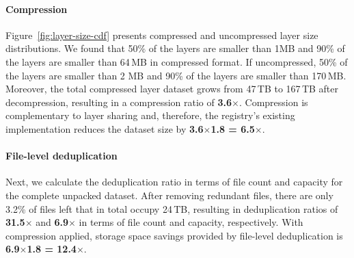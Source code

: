 %
%


%

\paragraph{Compression}
%
Figure~\ref{fig:layer-size-cdf} presents compressed and uncompressed layer size
distributions.
%
We found that 50\% of the layers are smaller than 1MB and 90\% of the layers are
smaller than 64\,MB in compressed format.
%
If uncompressed, 50\% of the layers are smaller than 2 MB and 90\% of the
layers are smaller than 170\,MB.
%
Moreover, the total compressed layer dataset grows from 47\,TB to 167\,TB after
decompression, resulting in a compression ratio of \textbf{3.6$\times$}.
%
Compression is complementary to layer sharing and, therefore, the registry's
existing implementation reduces the dataset size by \textbf{3.6$\times$1.8 = 6.5$\times$}.


\paragraph{File-level deduplication}
%
%
Next, we calculate the deduplication ratio in terms of file count and capacity for
the complete unpacked dataset.
%
After removing redundant files, there are only 3.2\% of files left that in total occupy
24\,TB, resulting in deduplication ratios of \textbf{31.5$\times$} and
\textbf{6.9$\times$} in terms of file count and capacity, respectively.
%
With compression applied, storage space savings provided by
file-level deduplication is \textbf{6.9$\times$1.8 = 12.4$\times$}.
%


